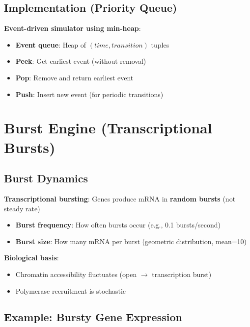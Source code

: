 \subsection{Implementation (Priority Queue)}
\label{subsec:priority-queue}

\textbf{Event-driven simulator using min-heap}:

\begin{itemize}
    \item \textbf{Event queue}: Heap of $(time, transition)$ tuples
    \item \textbf{Peek}: Get earliest event (without removal)
    \item \textbf{Pop}: Remove and return earliest event
    \item \textbf{Push}: Insert new event (for periodic transitions)
\end{itemize}

\section{Burst Engine (Transcriptional Bursts)}
\label{sec:burst-engine}

\subsection{Burst Dynamics}
\label{subsec:burst-dynamics}

\textbf{Transcriptional bursting}: Genes produce mRNA in \textbf{random bursts} (not steady rate)

\begin{itemize}
    \item \textbf{Burst frequency}: How often bursts occur (e.g., 0.1 bursts/second)
    \item \textbf{Burst size}: How many mRNA per burst (geometric distribution, mean=10)
\end{itemize}

\textbf{Biological basis}:

\begin{itemize}
    \item Chromatin accessibility fluctuates (open $\to$ transcription burst)
    \item Polymerase recruitment is stochastic
\end{itemize}

\subsection{Example: Bursty Gene Expression}
\label{subsec:bursty-example}

